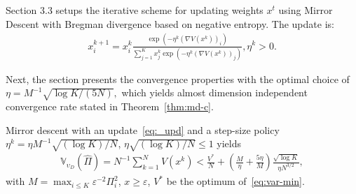 Section 3.3 setups the iterative scheme for updating weights $x^t$ using Mirror Descent with Bregman divergence based on negative entropy. The update is:
\begin{align}
\label{eq:_upd}x^{k+1}_i = x^k_i \frac{\exp(-\eta^k(\nabla V(x^k))_i)}{\sum_{j=1}^K x^k_j \exp(-\eta^k(\nabla V(x^k))_j)}, \eta^k > 0.
\end{align}

Next, the section presents the convergence properties
with the optimal choice of 
$\eta = M^{-1}\sqrt{\log K/(5N)},$ which yields almost dimension independent convergence rate stated in  Theorem~\ref{thm:md-c}. 
\begin{theorem}\label{thm:md-c} Mirror descent with an update~\eqref{eq:_upd} and a step-size policy $\eta^k \!=\! \eta M^{-1}\!\sqrt{(\log K)/N}$,  $\eta \sqrt{(\log K)/N}\!\le\! 1$ yields
\begin{align*}
    \mathbb{V}_{\upsilon_D} (\hat \Pi) = N^{-1}\sum_{k=1}^N V(x^k) < \frac{V^*}{N} +  \left(\frac{M}{\eta}+ \frac{5\eta}{M}\right)\frac{\sqrt{\log K}}{\eta N^{3/2}}, 
\end{align*}
with $M \!= \!\max_{i\le K}\varepsilon^{-2}\Pi_i^2$,  $x\!\ge\! \varepsilon$, $V^*$ be the optimum of~\eqref{eq:var-min}.
\end{theorem}

